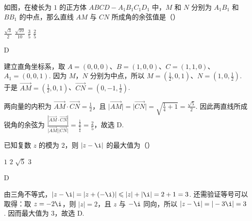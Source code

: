 \documentclass[UTF8,a4paper,oneside,11pt]{ctexbook}
\begin{document}
\begin{problem}
如图，在棱长为 \(1\) 的正方体 \(ABCD-A_1B_1C_1D_1\) 中，\(M\) 和 \(N\) 分别为 \(A_1B_1\) 和 \(BB_1\) 的中点，那么直线 \(AM\) 与 \(CN\) 所成角的余弦值是（\quad）


\choices
    {\(\frac{\sqrt{3}}{2}\)}
    {\(\frac{\sqrt{10}}{10}\)}
    {\(\frac{3}{5}\)}
    {\(\frac{2}{5}\)}

\begin{answer}
D
\end{answer}

\begin{solution}
建立直角坐标系，取 \(A=(0,0,0)\)、\(B=(1,0,0)\)、\(C=(1,1,0)\)、\(A_1=(0,0,1)\). 因为 \(M\)，\(N\) 分别为中点，所以
\(M=\left(\frac12,0,1\right)\)、\(N=\left(1,0,\frac12\right)\). 于是
\(\overrightarrow{AM}=\left(\frac12,0,1\right)\)、\(\overrightarrow{CN}=\left(0,-1,\frac12\right)\).

两向量的内积为 \(\overrightarrow{AM}\cdot\overrightarrow{CN}=\frac12\)，且
\(\lvert\overrightarrow{AM}\rvert=\lvert\overrightarrow{CN}\rvert=\sqrt{\frac14+1}=\frac{\sqrt5}{2}\). 因此两直线所成锐角的余弦为
\(\frac{\left|\overrightarrow{AM}\cdot\overrightarrow{CN}\right|}{\lvert\overrightarrow{AM}\rvert\lvert\overrightarrow{CN}\rvert}=\frac{\frac12}{\frac54}=\frac25\)，故选 D.
\end{solution}
\end{problem}

\begin{problem}
已知复数 \(z\) 的模为 \(2\)，则 \(|z-\i|\) 的最大值为（\quad）

\choices
    {\(1\)}
    {\(2\)}
    {\(\sqrt{5}\)}
    {\(3\)}

\begin{answer}
D
\end{answer}

\begin{solution}
由三角不等式，\(|z-\i|=|z+(-\i)|\leqslant|z|+|\i|=2+1=3\). 还需验证等号可以取得：取 \(z=-2\i\)，则 \(|z|=2\)，且 \(z\) 与 \(-\i\) 同向，所以
\(|z-\i|=|-3\i|=3\). 因而最大值为 \(3\)，故选 D.
\end{solution}
\end{problem}
\end{document}
